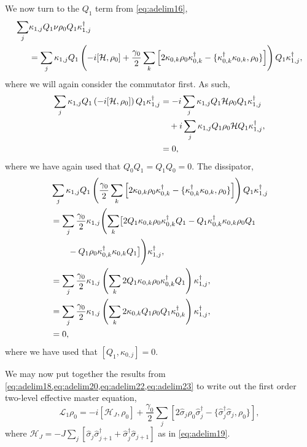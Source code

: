 We now turn to the \(Q_{1}\) term from \cref{eq:adelim16},
\begin{align}
	\sum_{j} &\kappa_{1,j}Q_{1}\nu\rho_{0}Q_{1}\kappa_{1,j}^{\dagger} \notag \\ 
	&= \sum_{j}\kappa_{1,j}Q_{1}\left(-i[\mathcal{H},\rho_{0}] + \frac{\gamma_{0}}{2}\sum_{k}\left[2\kappa_{0,k}\rho_{0}\kappa_{0,k}^{\dagger} - \{\kappa_{0,k}^{\dagger}\kappa_{0,k}, \rho_{0}\}\right]\right)Q_{1}\kappa_{1,j}^{\dagger},
	\label{eq:adelim21}
\end{align}
where we will again consider the commutator first. As such,
\begin{align}
	\sum_{j}\kappa_{1,j}Q_{1}\left(-i[\mathcal{H},\rho_{0}]\right)Q_{1}\kappa_{1,j}^{\dagger} &=  -i\sum_{j} \kappa_{1,j}Q_{1}\mathcal{H}\rho_{0}Q_{1}\kappa_{1,j}^{\dagger} \notag \\ 
	&\quad+ i \sum_{j} \kappa_{1,j}Q_{1} \rho_{0}\mathcal{H} Q_{1} \kappa_{1,j}^{\dagger}, \notag \\
	&= 0,
	\label{eq:adelim22}
\end{align}
where we have again used that \(Q_{0}Q_{1} = Q_{1}Q_{0} = 0\). The dissipator,
\begin{align}
	&\sum_{j} \kappa_{1,j}Q_{1} \left(\frac{\gamma_{0}}{2} \sum_{k} \left[2\kappa_{0,k}\rho_{0}\kappa_{0,k}^{\dagger} - \{\kappa_{0,k}^{\dagger}\kappa_{0,k},\rho_{0}\}\right]\right)Q_{1}\kappa_{1,j}^{\dagger} \notag \\
	&= \sum_{j} \frac{\gamma_{0}}{2}\kappa_{1,j} \Biggl(\sum_{k}\bigl[2Q_{1}\kappa_{0,k}\rho_{0}\kappa_{0,k}^{\dagger}Q_{1} - Q_{1}\kappa_{0,k}^{\dagger}\kappa_{0,k}\rho_{0}Q_{1} \notag \\ 
	&\qquad - Q_{1}\rho_{0}\kappa_{0,k}^{\dagger}\kappa_{0,k}Q_{1}\bigr]\Biggr)\kappa_{1,j}^{\dagger}, \notag \\
	&= \sum_{j} \frac{\gamma_{0}}{2} \kappa_{1,j} \left( \sum_{k} 2Q_{1}\kappa_{0,k}\rho_{0}\kappa_{0,k}^{\dagger}Q_{1}\right)\kappa_{1,j}^{\dagger}, \notag \\
	&= \sum_{j} \frac{\gamma_{0}}{2} \kappa_{1,j} \left( \sum_{k} 2\kappa_{0,k}Q_{1}\rho_{0}Q_{1}\kappa_{0,k}^{\dagger}\right)\kappa_{1,j}^{\dagger}, \notag \\
	&= 0,
	\label{eq:adelim23}
\end{align}
where we have used that \([Q_{1},\kappa_{0,j}] = 0\).

We may now put together the results from \cref{eq:adelim18,eq:adelim20,eq:adelim22,eq:adelim23} to write out the first order two-level effective master equation,
\begin{equation}
	\mathcal{L}_{1}\rho_{0} = -i\left[ \mathcal{H}_{J}, \rho_{0} \right] + \frac{\gamma_{0}}{2} \sum_{j} \left[2\hat{\sigma}_{j}\rho_{0}\hat{\sigma}_{j}^{\dagger} - \{\hat{\sigma}_{j}^{\dagger}\hat{\sigma}_{j}, \rho_{0}\}\right],
	\label{eq:adelim24}
\end{equation}
where \(\mathcal{H}_{J} = -J\sum_{j}[\hat{\sigma}_{j}\hat{\sigma}_{j+1}^{\dagger} + \hat{\sigma}_{j}^{\dagger}\hat{\sigma}_{j+1}]\) as in \cref{eq:adelim19}.

